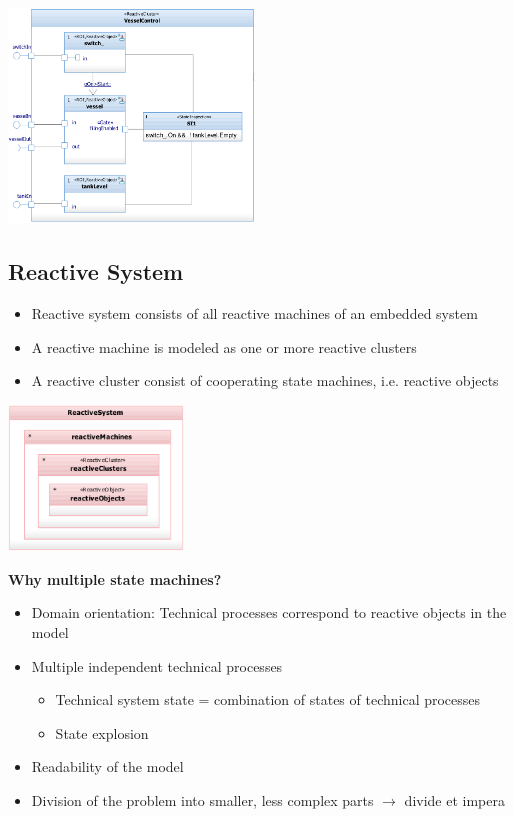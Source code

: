 \begin{paracol}{2}
    \includegraphics[width=0.49\textwidth]{images/ReactiveBehaviourNotation/component_based_model.png}
\end{paracol}

\begin{paracol}{2}
    \subsection{Reactive System}
    \begin{itemize}
        \item Reactive system consists of all reactive machines of an embedded system
        \item A reactive machine is modeled as one or more reactive clusters
        \item A reactive cluster consist of cooperating state machines, i.e. reactive objects
    \end{itemize}

    \switchcolumn

    \includegraphics[width=0.35\textwidth]{images/ReactiveBehaviourNotation/reactive_system.png}
\end{paracol}
\textbf{Why multiple state machines?}
\begin{itemize}
    \item Domain orientation: Technical processes correspond to reactive objects in the model
    \item Multiple independent technical processes
          \begin{itemize}
              \item Technical system state = combination of states of technical processes
              \item State explosion
          \end{itemize}
    \item Readability of the model
    \item Division of the problem into smaller, less complex parts $\rightarrow$ \glqq divide et impera\grqq
\end{itemize}

